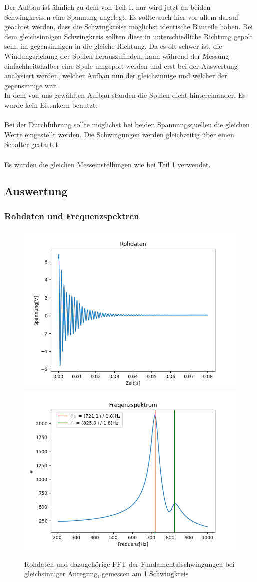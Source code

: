 \documentclass[12pt,a4paper]{article}
\begin{document}
Der Aufbau ist ähnlich zu dem von Teil 1, nur wird jetzt an beiden Schwingkreisen eine Spannung angelegt. Es sollte auch hier vor allem darauf geachtet werden, dass die Schwingkreise möglichst identische Bauteile haben.
Bei dem gleichsinnigen Schwingkreis sollten diese in unterschiedliche Richtung gepolt sein, im gegensinnigen in die gleiche Richtung. Da es oft schwer ist, die Windungsrichung der Spulen herauszufinden, kann während der Messung einfachheitshalber eine Spule umgepolt werden und erst bei der Auswertung analysiert werden, welcher Aufbau nun der gleichsinnige und welcher der gegensinnige war.\\
In dem von uns gewählten Aufbau standen die Spulen dicht hintereinander. Es wurde kein Eisenkern benutzt.\\
\\
Bei der Durchführung sollte möglichst bei beiden Spannungsquellen die gleichen Werte eingestellt werden. Die Schwingungen werden gleichzeitig über einen Schalter gestartet.\\
\\
Es wurden die gleichen Messeinstellungen wie bei Teil 1 verwendet.

\subsection{Auswertung}

\subsubsection{Rohdaten und Frequenzspektren}
\begin{figure}
\begin{center}
\includegraphics[width=0.49\linewidth]{Bilder/Fund_Rohdaten1.PNG}
\includegraphics[width=0.49\linewidth]{Bilder/Fund_Frequenz1.PNG}
\end{center}
\caption[Aufbau Schwebung]{Rohdaten und dazugehörige FFT der Fundamentalschwingungen bei gleichsinniger Anregung, gemessen am 1.Schwingkreis}
\label{fig:Fund_Roh1}
\end{figure}
\end{document}
